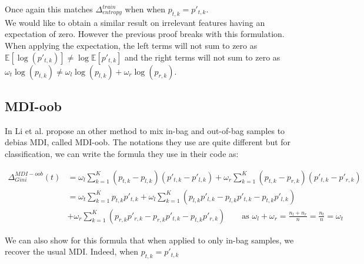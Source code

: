 \documentclass{article}
\begin{document}
Once again this matches $\Delta_{entropy}^{train}$ when when $p_{t,k} = p'_{t,k}$.
\\
We would like to obtain a similar result on irrelevant features having an expectation of zero. However the previous proof breaks with this formulation. When applying the expectation, the left terms will not sum to zero as $\mathbb{E}[ \log(p'_{t,k}) ] \neq \log \mathbb{E} [ p'_{t,k} ] $ and the right terms will not sum to zero as $\omega_t \log(p_{t,k}) \neq \omega_l \log(p_{l,k}) + \omega_r \log(p_{r,k})$. 


\subsection{MDI-oob}

In\cite{MDI-oob} Li et al. propose an other method to mix in-bag and out-of-bag samples to debias MDI, called MDI-oob. The notations they use are quite different but for classification, we can write the formula they use in their code as:
 
 \begin{align*}
    \Delta_{Gini}^{MDI-oob} (t) &= \omega_l \sum_{k=1}^K (p_{t,k} - p_{l,k})(p'_{t,k} - p'_{l,k}) + \omega_r \sum_{k=1}^K (p_{t,k} - p_{r,k})(p'_{t,k} - p'_{r,k}) \\
    &= \omega_t\sum_{k=1}^K p_{t,k}p'_{t,k} + \omega_l\sum_{k=1}^K (p_{l,k}p'_{l,k} - p_{l,k}p'_{t,k} - p_{t,k}p'_{l,k}) \\
    &+\omega_r\sum_{k=1}^K (p_{r,k}p'_{r,k} - p_{r,k}p'_{t,k} - p_{t,k}p'_{r,k}) \quad \quad \text{as } \omega_l + \omega_r = \frac{n_l + n_r}{n} = \frac{n_t}{n}= \omega_t
 \end{align*}
 
We can also show for this formula that when applied to only in-bag samples, we recover the usual MDI. Indeed, when $p_{t,k} = p'_{t,k}$
 
\end{document}
